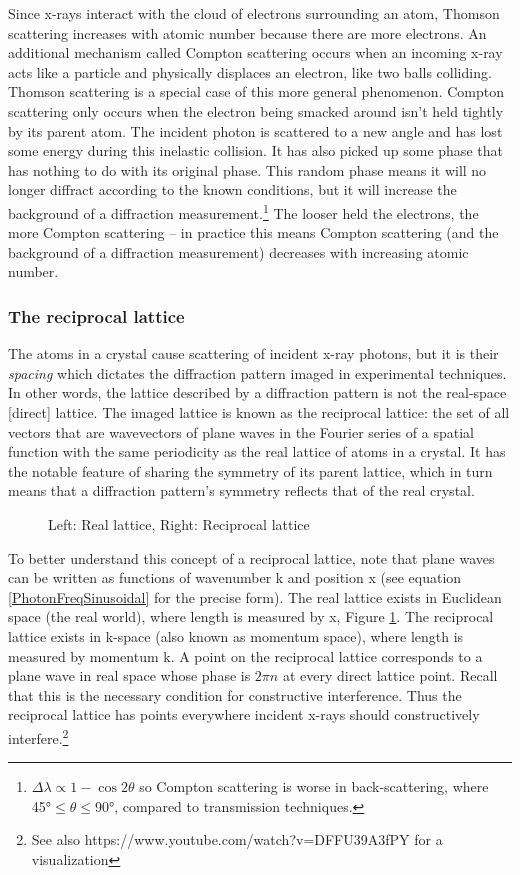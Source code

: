 Since x-rays interact with the cloud of electrons surrounding an atom, Thomson scattering increases with atomic number because there are more electrons. An additional mechanism called Compton scattering occurs when an incoming x-ray acts like a particle and physically displaces an electron, like two balls colliding. Thomson scattering is a special case of this more general phenomenon. Compton scattering only occurs when the electron being smacked around isn’t held tightly by its parent atom. The incident photon is scattered to a new angle and has lost some energy during this inelastic collision. It has also picked up some phase that has nothing to do with its original phase. This random phase means it will no longer diffract according to the known conditions, but it will increase the background of a diffraction measurement.\footnote{$\Delta\lambda\propto 1-\cos{2\theta}$ so Compton scattering is worse in back-scattering, where \ang{45}$\leq\theta\leq$\ang{90}, compared to transmission techniques.} The looser held the electrons, the more Compton scattering – in practice this means Compton scattering (and the background of a diffraction measurement) decreases with increasing atomic number.

\subsubsection{The reciprocal lattice}
The atoms in a crystal cause scattering of incident x-ray photons, but it is their \textit{spacing} which dictates the diffraction pattern imaged in experimental techniques. In other words, the lattice described by a diffraction pattern is not the real-space [direct] lattice. The imaged lattice is known as the reciprocal lattice: the set of all vectors that are wavevectors of plane waves in the Fourier series of a spatial function with the same periodicity as the real lattice of atoms in a crystal. It has the notable feature of sharing the symmetry of its parent lattice, which in turn means that a diffraction pattern's symmetry reflects that of the real crystal.

\begin{figure}[htbp]
  \centering
  
  \caption{Left: Real lattice, Right: Reciprocal lattice}
  \label{RecipLatt}
\end{figure}

To better understand this concept of a reciprocal lattice, note that plane waves can be written as functions of wavenumber k and position x (see equation \ref{PhotonFreqSinusoidal} for the precise form). The real lattice exists in Euclidean space (the real world), where length is measured by x, Figure \ref{RecipLatt}. The reciprocal lattice exists in k-space (also known as momentum space), where length is measured by momentum k. A point on the reciprocal lattice corresponds to a plane wave in real space whose phase is $2\pi n$ at every direct lattice point. Recall that this is the necessary condition for constructive interference. Thus the reciprocal lattice has points everywhere incident x-rays should constructively interfere.\footnote{See also https://www.youtube.com/watch?v=DFFU39A3fPY for a visualization}

